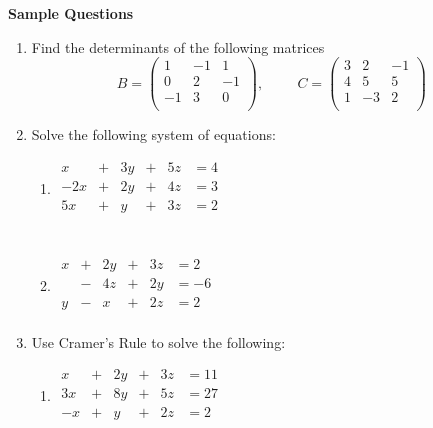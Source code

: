 \documentclass[11pt,a4paper]{article}
\begin{document}
\pagebreak
\begin{center}
\textbf{Sample Questions}
\end{center}

\begin{enumerate}
\item Find the determinants of the following matrices
$$B=
\begin{pmatrix}
1 & -1 & 1\\
0 & 2 & -1\\ 
-1 & 3 & 0\\
\end{pmatrix}
,\hspace{1cm}
C=
\begin{pmatrix}
3 & 2 & -1\\
4 & 5 & 5\\
1 & -3 & 2\\
\end{pmatrix}
$$

\item Solve the following system of equations:
\begin{enumerate}
\item \hspace{0.4cm}
$
\begin{matrix}
x & + & 3y & + & 5z & =4\\
-2x & + & 2y & + &4z & =3\\
5x & + & y & + & 3z & =2\\
\end{matrix}
$\\\\

\item \hspace{0.4cm}
$
\begin{matrix}
x & + & 2y & + & 3z & =2\\
  & - & 4z & + & 2y  & = -6\\
y & - & x & + & 2z & = 2\\
\end{matrix}
$\\
\end{enumerate}


\item Use Cramer's Rule  to solve the following:
\begin{enumerate}
\item \hspace{0.4cm}
$
\begin{matrix}
x & + & 2y & + & 3z & =11\\
3x & + & 8y & + & 5z & =27\\
-x & + & y & + & 2z & = 2\\
\end{matrix}
$\\\\


\end{enumerate}
\end{enumerate}
\end{document}

